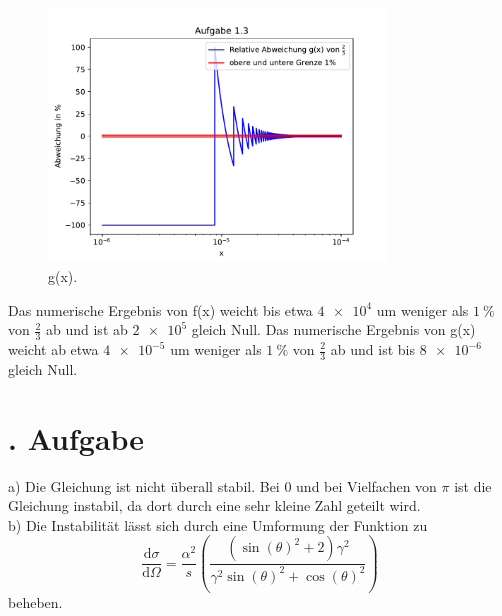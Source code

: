 \documentclass[
  bibliography=totoc,     %
  captions=tableheading,  %
  titlepage=firstiscover, %
]{scrartcl}
\begin{document}
\begin{figure}[H]
  \centering
  \includegraphics[width=0.8\textwidth]{aufgabe13.pdf}
  \caption{g(x).}
  \label{fig:3}
\end{figure}
\clearpage
\noindent
Das numerische Ergebnis von f(x) weicht bis etwa $\num{4e4}$ um weniger als $\SI{1}{\percent}$
von $\frac{2}{3}$ ab und ist ab $\num{2e5}$ gleich Null.
Das numerische Ergebnis von g(x) weicht ab etwa $\num{4e-5}$ um weniger als $\SI{1}{\percent}$
von $\frac{2}{3}$ ab und ist bis $\num{8e-6}$ gleich Null.

\section{. Aufgabe}
\noindent
a) Die Gleichung ist nicht überall stabil. Bei 0 und bei Vielfachen von $\pi$
ist die Gleichung instabil, da dort durch eine sehr kleine Zahl geteilt wird.\\

\noindent
b) Die Instabilität lässt sich durch eine Umformung der Funktion zu
\begin{equation*}
  \frac{\mathup{d}\sigma}{\mathup{d}\Omega}= \frac{\alpha^2}{s} \left(\frac{(\sin(\theta)^2+2)\gamma^2}{\gamma^2 \sin(\theta)^2 + \cos(\theta)^2}\right)
\end{equation*}
beheben.\\
\end{document}
